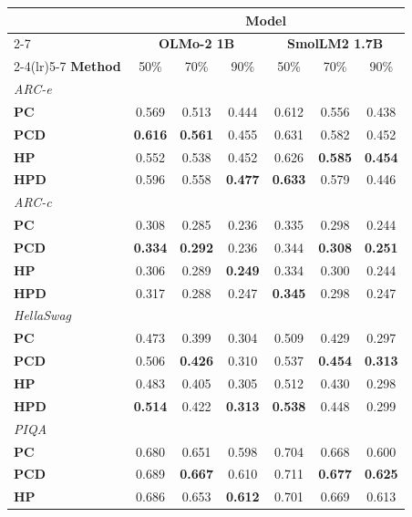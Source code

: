 \begin{table}[t!]
\centering
\small
\setlength{\tabcolsep}{3pt}
\begin{tabular}{lccc|ccc}
\toprule
& \multicolumn{6}{c}{\textbf{Model}} \\
\cmidrule(lr){2-7}
& \multicolumn{3}{c|}{\textbf{OLMo-2 1B}} & \multicolumn{3}{c}{\textbf{SmolLM2 1.7B}} \\
\cmidrule(lr){2-4}\cmidrule(lr){5-7}
\textbf{Method} & 50\% & 70\% & 90\% & 50\% & 70\% & 90\% \\
\midrule
\multicolumn{7}{l}{\textit{ARC-e}} \\
\textbf{PC} & 0.569 & 0.513 & 0.444 & 0.612 & 0.556 & 0.438 \\
\textbf{PCD} & \textbf{0.616} & \textbf{0.561} & 0.455 & 0.631 & 0.582 & 0.452 \\
\textbf{HP} & 0.552 & 0.538 & 0.452 & 0.626 & \textbf{0.585} & \textbf{0.454} \\
\textbf{HPD} & 0.596 & 0.558 & \textbf{0.477} & \textbf{0.633} & 0.579 & 0.446 \\
\midrule
\multicolumn{7}{l}{\textit{ARC-c}} \\
\textbf{PC} & 0.308 & 0.285 & 0.236 & 0.335 & 0.298 & 0.244 \\
\textbf{PCD} & \textbf{0.334} & \textbf{0.292} & 0.236 & 0.344 & \textbf{0.308} & \textbf{0.251} \\
\textbf{HP} & 0.306 & 0.289 & \textbf{0.249} & 0.334 & 0.300 & 0.244 \\
\textbf{HPD} & 0.317 & 0.288 & 0.247 & \textbf{0.345} & 0.298 & 0.247 \\
\midrule
\multicolumn{7}{l}{\textit{HellaSwag}} \\
\textbf{PC} & 0.473 & 0.399 & 0.304 & 0.509 & 0.429 & 0.297 \\
\textbf{PCD} & 0.506 & \textbf{0.426} & 0.310 & 0.537 & \textbf{0.454} & \textbf{0.313} \\
\textbf{HP} & 0.483 & 0.405 & 0.305 & 0.512 & 0.430 & 0.298 \\
\textbf{HPD} & \textbf{0.514} & 0.422 & \textbf{0.313} & \textbf{0.538} & 0.448 & 0.299 \\
\midrule
\multicolumn{7}{l}{\textit{PIQA}} \\
\textbf{PC} & 0.680 & 0.651 & 0.598 & 0.704 & 0.668 & 0.600 \\
\textbf{PCD} & 0.689 & \textbf{0.667} & 0.610 & 0.711 & \textbf{0.677} & \textbf{0.625} \\
\textbf{HP} & 0.686 & 0.653 & \textbf{0.612} & 0.701 & 0.669 & 0.613 \\

\end{tabular}
\end{table}
